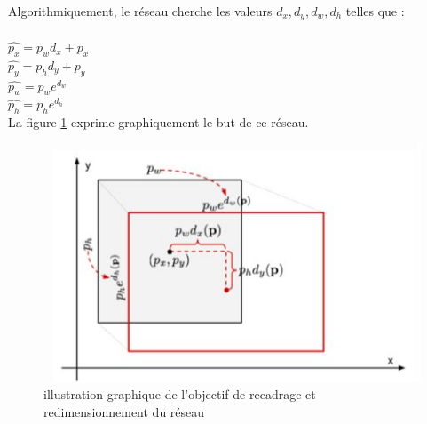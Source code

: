 Algorithmiquement, le réseau cherche les valeurs $d_x,d_y,d_w,d_h$ telles que :\\
\\
$\hat{p_x} = p_w d_x + p_x$\\
$\hat{p_y} = p_h d_y + p_y$\\
$\hat{p_w} = p_w e^{d_w}$ \\
$\hat{p_h} = p_h e^{d_h}$\\

La figure \ref{redimensionnement} exprime graphiquement le but de ce réseau.

\begin{figure}[!h]
\centering
\includegraphics[width=200pts]{images/Mask_R_CNN/redimensionnement.png} 
\caption{illustration graphique de l'objectif de recadrage et redimensionnement du réseau}
\label{redimensionnement}
\end{figure}

